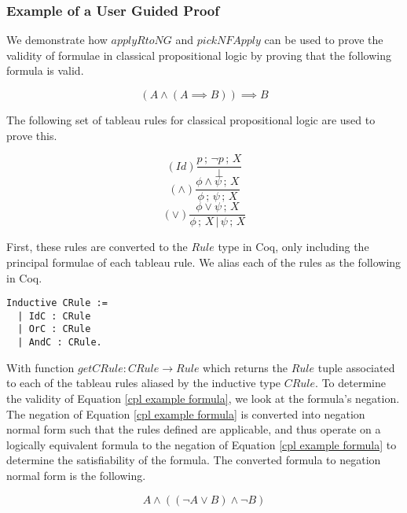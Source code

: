 \documentclass{article}
\newcommand{\eref}[1]{Equation \ref{#1}}
\begin{document}
\subsubsection{Example of a User Guided Proof}

We demonstrate how $applyRtoNG$ and $pickNFApply$ can be used to prove the
validity of formulae in classical propositional logic by proving that the
following formula is valid.

\begin{equation}
(A \wedge (A \implies B)) \implies B
\label{cpl example formula}
\end{equation}

The following set of tableau rules for classical propositional logic are used
to prove this.

\begin{multicols}{3}
\begin{equation*}
(Id)\frac{p\,;\,\neg p\,;\,X}{\bot}
\end{equation*}
\break
\begin{equation*}
(\wedge)\frac{\phi \wedge \psi\,;\,X}{\phi\,;\,\psi\,;\,X}
\end{equation*}
\break
\begin{equation*}
(\vee)\frac{\phi \vee \psi\,;\,X}{\phi\,;\,X\,|\,\psi\,;\,X}
\end{equation*}
\end{multicols}

First, these rules are converted to the $Rule$ type in Coq, only including
the principal formulae of each tableau rule. We alias each of the rules as the
following in Coq.

\begin{lstlisting}
Inductive CRule := 
  | IdC : CRule
  | OrC : CRule
  | AndC : CRule.
\end{lstlisting}

With function $getCRule : CRule \rightarrow Rule$ which returns the $Rule$
tuple associated to each of the tableau rules aliased by the inductive type
$CRule$. To determine the validity of \eref{cpl example formula}, we look at
the formula's negation. The negation of \eref{cpl example formula} is converted
into negation normal form such that the rules defined are applicable, and thus
operate on a logically equivalent formula to the negation of \eref{cpl
example formula} to determine the satisfiability of the formula. The converted
formula to negation normal form is the following.

\begin{equation}
A \wedge ((\neg A \vee B) \wedge \neg B)
\label{cpl example nnf}
\end{equation}
\end{document}
